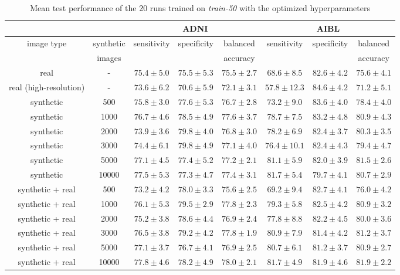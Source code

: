 \documentclass[10pt,journal,compsoc]{IEEEtran}
\begin{document}
\begin{table*}[ht]
 \caption{Mean test performance of the 20 runs trained on \textit{train-50} with the optimized hyperparameters}
 \label{table:app train-50_random}
\centering
\scriptsize
  \begin{tabular}{|c|c||c|c|c||c|c|c|}
    \cline{3-8}
    \multicolumn{2}{c|}{} & \multicolumn{3}{c||}{ADNI} & \multicolumn{3}{c|}{AIBL} \\
    \hline
    \multirow{2}{*}{image type} & synthetic & \multirow{2}{*}{sensitivity} & \multirow{2}{*}{specificity} & balanced & \multirow{2}{*}{sensitivity} & \multirow{2}{*}{specificity} & balanced\\
    & images & & & accuracy & & & accuracy\\
    \hline
    \hline
    real & - & $75.4\pm5.0$ & $75.5\pm5.3$ & $75.5\pm2.7$ & $68.6\pm8.5$ & $82.6\pm4.2$ & $75.6\pm4.1$ \\
    real (high-resolution) & - & $73.6\pm6.2$ & $70.6\pm5.9$ & $72.1\pm3.1$ & $57.8\pm12.3$ & $84.6\pm4.2$ & $71.2\pm5.1$ \\
    \hline
    synthetic & 500 & $75.8\pm3.0$ & $77.6\pm5.3$ & $76.7\pm2.8$ & $73.2\pm9.0$ & $\boldsymbol{83.6\pm4.0}$ & $78.4\pm4.0$ \\
    synthetic & 1000 & $76.7\pm4.6$ & $78.5\pm4.9$ & $\boldsymbol{77.6\pm3.7}$ & $78.7\pm7.5$ & $83.2\pm4.8$ & $80.9\pm4.3$ \\
    synthetic & 2000 & $73.9\pm3.6$ & $\boldsymbol{79.8\pm4.0}$ & $76.8\pm3.0$ & $78.2\pm6.9$ & $82.4\pm3.7$ & $80.3\pm3.5$ \\
    synthetic & 3000 & $74.4\pm6.1$ & $79.8\pm4.9$ & $77.1\pm4.0$ & $76.4\pm10.1$ & $82.4\pm4.3$ & $79.4\pm4.7$ \\
    synthetic & 5000 & $77.1\pm4.5$ & $77.4\pm5.2$ & $77.2\pm2.1$ & $81.1\pm5.9$ & $82.0\pm3.9$ & $\boldsymbol{81.5\pm2.6}$ \\
    synthetic & 10000 & $\boldsymbol{77.5\pm5.3}$ & $77.3\pm4.7$ & $77.4\pm3.1$ & $\boldsymbol{81.7\pm5.4}$ & $79.7\pm4.1$ & $80.7\pm2.9$ \\
    \hline
    synthetic + real & 500 & $73.2\pm4.2$ & $78.0\pm3.3$ & $75.6\pm2.5$ & $69.2\pm9.4$ & $\boldsymbol{82.7\pm4.1}$ & $76.0\pm4.2$ \\
    synthetic + real & 1000 & $76.1\pm5.3$ & $\boldsymbol{79.5\pm2.9}$ & $77.8\pm2.3$ & $79.3\pm5.8$ & $82.5\pm4.2$ & $80.9\pm3.2$ \\
    synthetic + real & 2000 & $75.2\pm3.8$ & $78.6\pm4.4$ & $76.9\pm2.4$ & $77.8\pm8.8$ & $82.2\pm4.5$ & $80.0\pm3.6$ \\
    synthetic + real & 3000 & $76.5\pm3.8$ & $79.2\pm4.2$ & $77.8\pm1.9$ & $80.9\pm7.9$ & $81.4\pm4.2$ & $81.2\pm3.7$ \\
    synthetic + real & 5000 & $77.1\pm3.7$ & $76.7\pm4.1$ & $76.9\pm2.5$ & $80.7\pm6.1$ & $81.2\pm3.7$ & $80.9\pm2.7$ \\
    synthetic + real & 10000 & $\boldsymbol{77.8\pm4.6}$ & $78.2\pm4.9$ & $\boldsymbol{78.0\pm2.1}$ & $\boldsymbol{81.7\pm4.9}$ & $81.9\pm4.6$ & $\boldsymbol{81.9\pm2.2}$ \\
    \hline
  \end{tabular}%
\end{table*}
\end{document}
